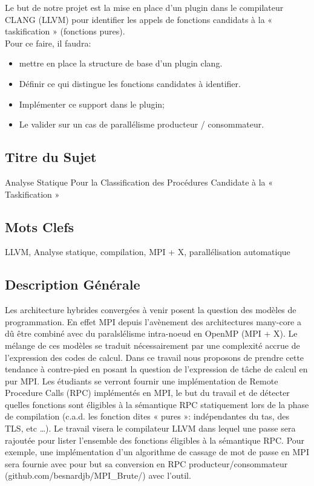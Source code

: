 \documentclass[12pt,titlepage]{article}
\begin{document}
Le but de notre projet est la mise en place d’un plugin dans le compilateur CLANG (LLVM) pour identifier les appels de fonctions candidats à la « taskification » (fonctions pures).\\
Pour ce faire, il faudra: \\

\begin{itemize}
	\item mettre en place la structure de base d’un plugin clang.
	\item Définir ce qui distingue les fonctions candidates à identifier.
	\item Implémenter ce support dans le plugin;
	\item Le valider sur un cas de parallélisme producteur /
	consommateur.
\end{itemize}

\subsection{Titre du Sujet}

Analyse Statique Pour la Classification des Procédures Candidate à la « Taskification »


\subsection{Mots Clefs}

LLVM, Analyse statique, compilation, MPI + X, parallélisation automatique


\subsection{Description Générale}

Les architecture hybrides convergées à venir posent la question des modèles de programmation. En effet MPI depuis l’avènement des architectures many-core a dû être combiné avec du paralslélisme intra-noeud en OpenMP (MPI + X). Le mélange de ces modèles se traduit nécessairement par une complexité accrue de l’expression des codes de calcul. Dans ce travail nous proposons de prendre cette tendance à contre-pied en posant la question de l’expression de tâche de calcul en pur MPI. Les étudiants se verront fournir une implémentation de Remote Procedure Calls (RPC) implémentés en MPI, le but du travail et de détecter quelles fonctions sont éligibles à la sémantique RPC statiquement lors de la phase de compilation (c.a.d. les fonction dites « pures »: indépendantes du tas, des TLS, etc …). Le travail visera le compilateur LLVM dans lequel une passe sera rajoutée pour lister l’ensemble des fonctions éligibles à la sémantique RPC. Pour exemple, une implémentation d’un algorithme de cassage de mot de passe en MPI sera fournie avec pour but sa conversion en RPC producteur/consommateur (github.com/besnardjb/MPI\_Brute/) avec l’outil.
\end{document}
